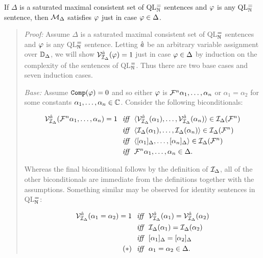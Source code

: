 \begin{Lthm} \label{lemma:truth}
  If $\Delta$ is a saturated maximal consistent set of QL$^=_{\mathbb{N}}$ sentences and $\varphi$ is any QL$^=_{\mathbb{N}}$ sentence, then $\mathcal{M}_\Delta$ satisfies $\varphi$ just in case $\varphi\in\Delta$.  
\end{Lthm}

\begin{quote} 
  \textit{Proof:} 
  Assume $\Delta$ is a saturated maximal consistent set of QL$^=_{\mathbb{N}}$ sentences and $\varphi$ is any QL$^=_{\mathbb{N}}$ sentence.
  Letting $\hat{a}$ be an arbitrary variable assignment over $\mathbb{D}_\Delta$, we will show $\mathcal{V}_{\mathcal{I}_\Delta}^{\hat{a}}(\varphi)=1$ just in case $\varphi\in\Delta$ by induction on the complexity of the sentences of QL$^=_{\mathbb{N}}$.
  Thus there are two base cases and seven induction cases.

  \textit{Base:} 
  Assume $\texttt{Comp}(\varphi)=0$ and so either $\varphi$ is $\mathcal{F}^n\alpha_1,\ldots,\alpha_n$ or $\alpha_1=\alpha_2$ for some constants $\alpha_1,\ldots,\alpha_n\in\mathbb{C}$.
  Consider the following biconditionals:

  \vspace{-.2in}
  \begin{align*}
    \VV{\I_\Delta}{\va{a}}(\F^n\alpha_1,\ldots,\alpha_n)=1 %
      &\textit{ ~iff~ } \tuple{\VV{\I_\Delta}{\va{a}}(\alpha_1),\ldots,\VV{\I_\Delta}{\va{a}}(\alpha_n)}\in\I_\Delta(\F^n)\\
      &\textit{ ~iff~ } \tuple{\I_\Delta(\alpha_1),\ldots,\I_\Delta(\alpha_n)}\in\I_\Delta(\F^n)\\
      &\textit{ ~iff~ } \tuple{[\alpha_1]_\Delta,\ldots,[\alpha_n]_\Delta}\in\I_\Delta(\F^n)\\
      &\textit{ ~iff~ } \F^n\alpha_1,\ldots,\alpha_n\in\Delta.
  \end{align*}

  Whereas the final biconditional follows by the definition of $\mathcal{I}_\Delta$, all of the other biconditionals are immediate from the definitions together with the assumptions.
  Something similar may be observed for identity sentences in QL$^=_{\mathbb{N}}$:

  \vspace{-.2in}
  \begin{align*}
    \VV{\I_\Delta}{\va{a}}(\alpha_1=\alpha_2)=1 %
      &\textit{ ~iff~ } \VV{\I_\Delta}{\va{a}}(\alpha_1)=\VV{\I_\Delta}{\va{a}}(\alpha_2)\\
      &\textit{ ~iff~ } \I_\Delta(\alpha_1)=\I_\Delta(\alpha_2)\\
      &\textit{ ~iff~ } [\alpha_1]_\Delta=[\alpha_2]_\Delta\\
      (\ast) &\textit{ ~iff~ } \alpha_1=\alpha_2\in\Delta.
  \end{align*}


\end{quote}
